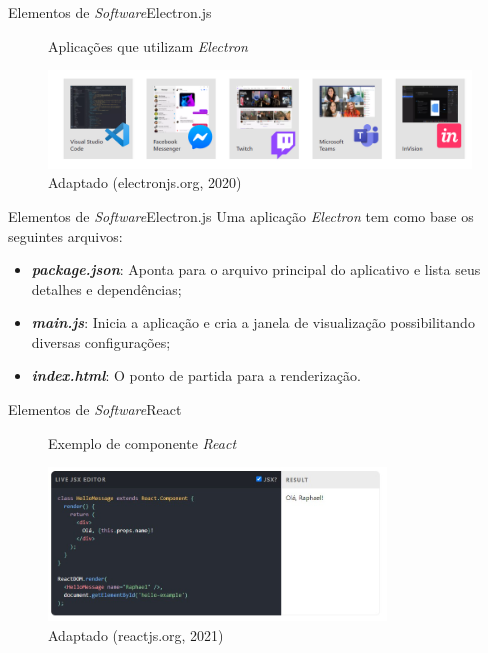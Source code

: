 \begin{frame}{Elementos de \textit{Software}}{Electron.js}

    \begin{figure}[H]
        \centering
        \caption{Aplicações que utilizam \textit{Electron}}
        \includegraphics[width=1.0\textwidth]{figuras/electron_apps.png}
        \caption*{\tiny{Adaptado (electronjs.org, 2020)}}
        \label{fig:electron_apps}
    \end{figure}

\end{frame}

\begin{frame}{Elementos de \textit{Software}}{Electron.js}
    Uma aplicação \textit{Electron} tem como base os seguintes arquivos:

\begin{itemize}
	\item \textbf{\textit{package.json}}: Aponta para o arquivo principal do aplicativo e lista seus detalhes e dependências;
	\item \textbf{\textit{main.js}}: Inicia a aplicação e cria a janela de visualização possibilitando diversas configurações; 
	\item \textbf{\textit{index.html}}: O ponto de partida para a renderização.
\end{itemize}

\end{frame}

\begin{frame}{Elementos de \textit{Software}}{React}

    \begin{figure}[H]
        \centering
        \caption{Exemplo de componente \textit{React}}
        \includegraphics[width=0.8\textwidth]{figuras/exemplo_react.jpg}
        \caption*{\tiny{Adaptado (reactjs.org, 2021)}}
        \label{fig:react_code}
    \end{figure}

\end{frame}

